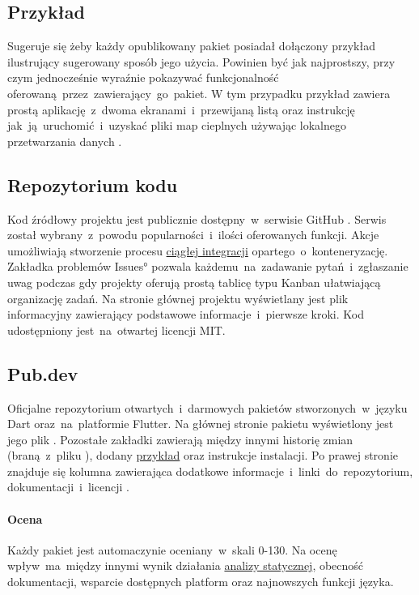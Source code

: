 
\subsection{Przykład}
\label{sec:rs_example}
Sugeruje się żeby każdy opublikowany pakiet posiadał dołączony przykład ilustrujący sugerowany sposób jego użycia. Powinien być jak najprostszy, przy czym jednocześnie wyraźnie pokazywać funkcjonalność oferowaną~przez~zawierający~go~pakiet. W tym przypadku przykład zawiera prostą aplikację~z~dwoma ekranami~i~przewijaną listą oraz instrukcję jak~ją~uruchomić~i~uzyskać pliki map cieplnych używając lokalnego przetwarzania danych \cite{RS_Example}.

\subsection{Repozytorium kodu}
Kod źródłowy projektu jest publicznie dostępny~w~serwisie GitHub \cite{RoundSpot_GitHub}. Serwis został wybrany~z~powodu popularności~i~ilości oferowanych funkcji. Akcje umożliwiają stworzenie procesu \hyperref[sec:rs_ci]{ciągłej integracji} opartego~o~konteneryzację. Zakładka problemów \ang{Issues} pozwala każdemu~na~zadawanie pytań~i~zgłaszanie uwag podczas gdy projekty oferują prostą tablicę typu Kanban ułatwiającą organizację zadań. Na stronie głównej projektu wyświetlany jest plik informacyjny  zawierający podstawowe informacje~i~pierwsze kroki. Kod udostępniony jest~na~otwartej licencji MIT.

\subsection{Pub.dev}
Oficjalne repozytorium otwartych~i~darmowych pakietów stworzonych~w~języku Dart oraz~na~platformie Flutter. Na głównej stronie pakietu wyświetlony jest jego plik . Pozostałe zakładki zawierają między innymi historię zmian (braną~z~pliku ), dodany \hyperref[sec:rs_example]{przykład} oraz instrukcje instalacji. Po prawej stronie znajduje się kolumna zawierająca dodatkowe informacje~i~linki~do~repozytorium, dokumentacji~i~licencji \cite{RS_Pub_dev}.

\paragraph{Ocena} Każdy pakiet jest automaczynie oceniany~w~skali 0-130. Na ocenę wpływ~ma~między innymi wynik działania \hyperref[par:static_analysis]{analizy statycznej}, obecność dokumentacji, wsparcie dostępnych platform oraz najnowszych funkcji języka.


